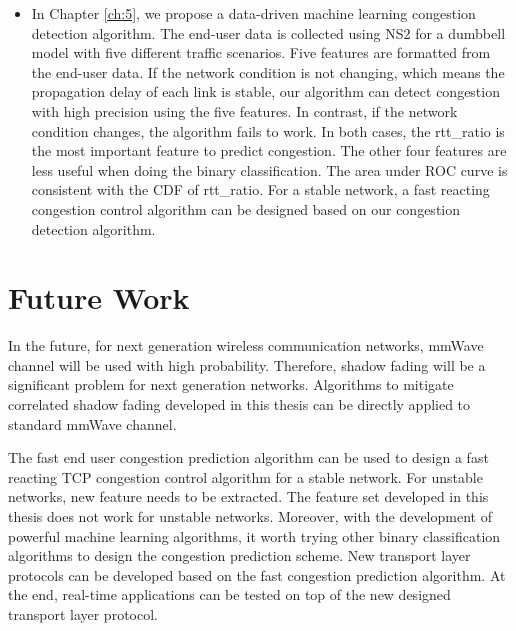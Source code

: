 \begin{itemize}
 \item In Chapter \ref{ch:5}, we propose a data-driven machine learning congestion detection algorithm. The end-user data is collected using NS2 for a dumbbell model with five different traffic scenarios. Five features are formatted from the end-user data. If the network condition is not changing, which means the propagation delay of each link is stable, our algorithm can detect congestion with high precision using the five features. In contrast, if the network condition changes, the algorithm fails to work. In both cases, the rtt\_ratio is the most important feature to predict congestion. The other four features are less useful when doing the binary classification. The area under ROC curve is consistent with the CDF of rtt\_ratio. For a stable network, a fast reacting congestion control algorithm can be designed based on our congestion detection algorithm.

 \end{itemize}
 \section{Future Work}
 \par In the future, for next generation wireless communication networks, mmWave channel will be used with high probability. Therefore, shadow fading will be a significant problem for next generation networks. Algorithms to mitigate correlated shadow fading developed in this thesis can be directly applied to standard mmWave channel. 
 \par The fast end user congestion prediction algorithm can be used to design a fast reacting TCP congestion control algorithm for a stable network. For unstable networks, new feature needs to be extracted. The feature set developed in this thesis does not work for unstable networks. Moreover, with the development of powerful machine learning algorithms, it worth trying other binary classification algorithms to design the congestion prediction scheme. New transport layer protocols can be developed based on the fast congestion prediction algorithm. At the end, real-time applications can be tested on top of the new designed transport layer protocol.